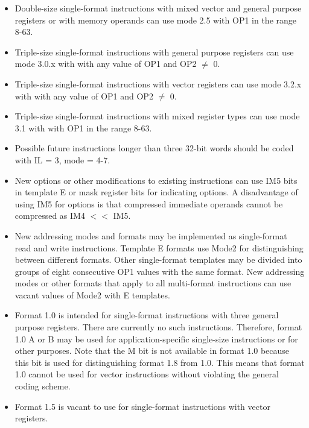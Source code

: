 \documentclass[forwardcom.tex]{subfiles}
\begin{document}
\begin{itemize}
\item Double-size single-format instructions with mixed vector and general purpose registers or with memory operands can use mode 2.5 with OP1 in the range 8-63.

\item Triple-size single-format instructions with general purpose registers can use mode 3.0.x with with any value of OP1 and OP2 $\neq$ 0.

\item Triple-size single-format instructions with vector registers can use mode 3.2.x with with any value of OP1 and OP2 $\neq$ 0.

\item Triple-size single-format instructions with mixed register types can use mode 3.1 with with OP1 in the range 8-63.

\item Possible future instructions longer than three 32-bit words should be coded with IL = 3, mode = 4-7.

\item New options or other modifications to existing instructions can use IM5 bits in template E or mask register bits for indicating options. A disadvantage of using IM5 for options is that compressed immediate operands cannot be compressed as IM4 $<<$ IM5.

\item New addressing modes and formats may be implemented as single-format read and write instructions. Template E formats use Mode2 for distinguishing between different formats. 
Other single-format templates may be divided into groups of eight consecutive OP1 values with the same format.
New addressing modes or other formats that apply to all multi-format instructions can use vacant values of Mode2 with E templates.

\item Format 1.0 is intended for single-format instructions with three general purpose registers. There are currently no such instructions. Therefore, format 1.0 A or B may be used for application-specific single-size instructions or for other purposes. Note that the M bit is not available in format 1.0 because this bit is used for distinguishing format 1.8 from 1.0. This means that format 1.0 cannot be used for vector instructions without violating the general coding scheme.

\item Format 1.5 is vacant to use for single-format instructions with vector registers.

\end{itemize}
\end{document}
